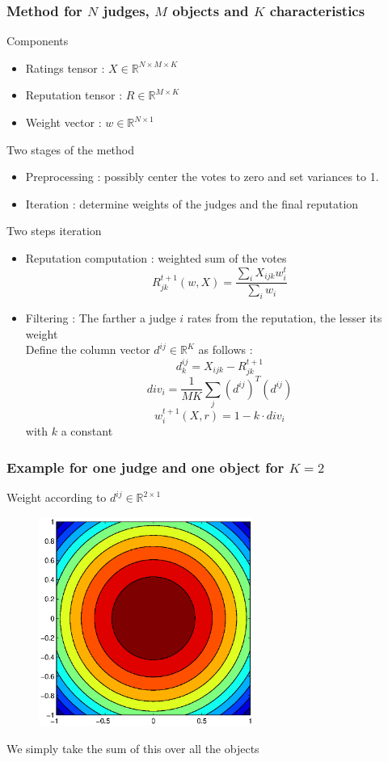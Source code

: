 \begin{frame}
\frametitle{Method for $N$ judges, $M$ objects and $K$ characteristics}
\begin{block}{Components}
\begin{itemize}
\item Ratings tensor : $X \in \mathbb{R}^{N\times M \times K}$
\item Reputation tensor : $R \in \mathbb{R}^{M\times K}$
\item Weight vector : $w \in \mathbb{R}^{N\times 1}$
\end{itemize}
\end{block}
\begin{block}{Two stages of the method}
\begin{itemize}
\item Preprocessing : possibly center the votes to zero and set variances to 1.
\item Iteration : determine weights of the judges and the final reputation
\end{itemize}
\end{block}
\end{frame}

\begin{frame}
\begin{block}{Two steps iteration}
\begin{itemize}
\item Reputation computation : weighted sum of the votes
$$R_{jk}^{t+1}(w,X) = \frac{\sum_{i}X_{ijk}w^t_{i}}{\sum_i w_{i}}$$
\item Filtering : The farther a judge $i$ rates from the reputation, the lesser its weight\\
Define the column vector $d^{ij} \in \mathbb{R}^K$ as follows :
$$ d^{ij}_k = X_{ijk}-R^{t+1}_{jk}$$
$$div_i =  \frac{1}{MK}\sum_{j} (d^{ij})^T (d^{ij})$$
$$w_i^{t+1}(X,r) = 1 -k \cdot div_i$$
with $k$ a constant 
\end{itemize}
\end{block}
\end{frame}
\begin{frame}
\frametitle{Example for one judge and one object for $K=2$}
\begin{block}{}
Weight according to $d^{ij}\in \mathbb{R}^{2\times 1}$
\begin{figure}
\centering
\includegraphics[width = 7cm]{../rapport/images/courbes.eps}
\end{figure}
We simply take the sum of this over all the objects
\end{block}
\end{frame}


